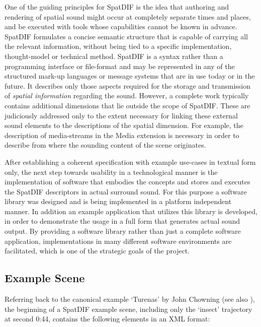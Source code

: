 \documentclass[a4paper]{article}
\begin{document}
One of the guiding principles for SpatDIF is the idea that authoring and rendering of spatial sound might occur at completely separate times and places, and be executed with tools whose capabilities cannot be known in advance. 
SpatDIF formulates a concise semantic structure that is capable of carrying all the relevant information, without being tied to a specific implementation, thought-model or technical method. 
SpatDIF is a syntax rather than a programming interface or file-format and may be represented in any of the structured mark-up languages or message systems that are in use today or in the future. 
It describes only those aspects required for the storage and transmission of \emph{spatial information} regarding the sound.
However, a complete work typically contains additional dimensions that lie outside the scope of SpatDIF. 
These are judiciously addressed only to the extent necessary for linking these external sound elements to the descriptions of the spatial dimension. 
For example, the description of media-streams in the Media extension is necessary in order to describe from where the sounding content of the scene originates.

After establishing a coherent specification with example use-cases in textual form only, the next step towards usability in a technological manner is the implementation of software that embodies the concepts and stores and executes the SpatDIF descriptors in actual surround sound.
For this purpose a software library was designed and is being implemented in a platform independent manner. 
In addition an example application that utilizes this library is developed, in order to demonstrate the usage in a full form that generates actual sound output.
By providing a software library rather than just a complete software application, implementations in many different software environments are facilitated, which is one of the  strategic goals of the project.

\subsection{Example Scene}
 
Referring back to the canonical example `Turenas' by John Chowning (see also \cite{Peters:2013SpatDifCMJ}), the beginning of a SpatDIF example scene, including only the `insect' trajectory at second 0:44, contains the following elements in an XML format:

 
\end{document}
